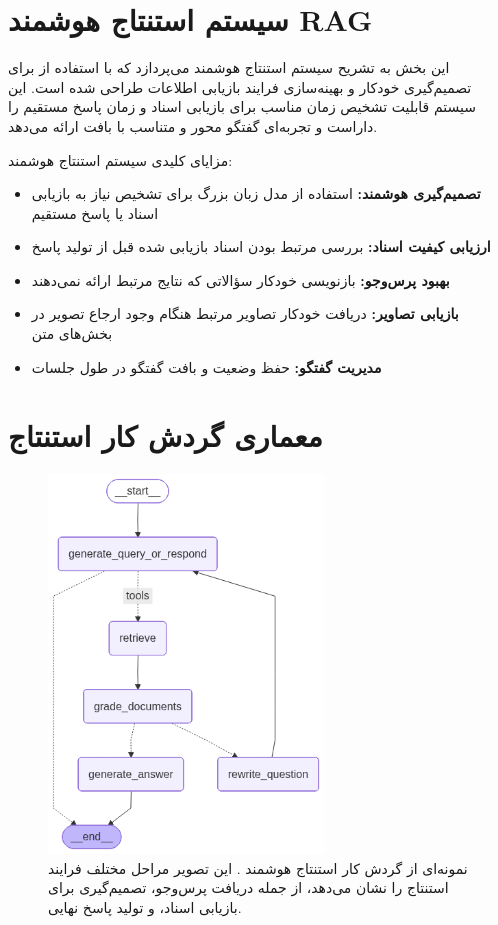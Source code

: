 
\section{سیستم استنتاج هوشمند RAG}
این بخش به تشریح سیستم استنتاج هوشمند  می‌پردازد که با استفاده از  برای تصمیم‌گیری خودکار و بهینه‌سازی فرایند بازیابی اطلاعات طراحی شده است. این سیستم قابلیت تشخیص زمان مناسب برای بازیابی اسناد و زمان پاسخ مستقیم را داراست و تجربه‌ای گفتگو محور و متناسب با بافت ارائه می‌دهد.

\noindent
مزایای کلیدی سیستم استنتاج هوشمند:
\begin{itemize}
    \item \textbf{تصمیم‌گیری هوشمند:} استفاده از مدل زبان بزرگ برای تشخیص نیاز به بازیابی اسناد یا پاسخ مستقیم
    \item \textbf{ارزیابی کیفیت اسناد:} بررسی مرتبط بودن اسناد بازیابی شده قبل از تولید پاسخ
    \item \textbf{بهبود پرس‌وجو:} بازنویسی خودکار سؤالاتی که نتایج مرتبط ارائه نمی‌دهند
    \item \textbf{بازیابی تصاویر:} دریافت خودکار تصاویر مرتبط هنگام وجود ارجاع تصویر در بخش‌های متن
    \item \textbf{مدیریت گفتگو:} حفظ وضعیت و بافت گفتگو در طول جلسات
\end{itemize}

\newpage

\section{معماری گردش کار استنتاج}

\begin{figure}[!htbp]
    \centering
    \includegraphics[width=0.65\textwidth]{agentic_rag_workflow.png}
    \caption{نمونه‌ای از گردش کار استنتاج هوشمند . این تصویر مراحل مختلف فرایند استنتاج را نشان می‌دهد، از جمله دریافت پرس‌وجو، تصمیم‌گیری برای بازیابی اسناد، و تولید پاسخ نهایی.}
    \label{fig:agentic_rag_workflow}
\end{figure}


